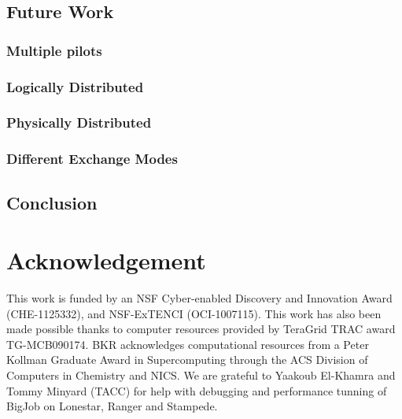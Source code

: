 \documentclass{sig-alternate}
\begin{document}
\subsection{Future Work}

\subsubsection{Multiple pilots}

\subsubsection{Logically Distributed}
\subsubsection{Physically Distributed}

\subsubsection{Different Exchange Modes}


\subsection{Conclusion}

\section*{Acknowledgement} {\footnotesize This work is funded by an
  NSF Cyber-enabled Discovery and Innovation Award (CHE-1125332), and
  NSF-ExTENCI (OCI-1007115). This work has also been made possible
  thanks to computer resources provided by TeraGrid TRAC award
  TG-MCB090174.  BKR acknowledges computational resources from a 
  Peter Kollman Graduate Award in Supercomputing through the ACS Division of 
  Computers in Chemistry and NICS. We are grateful to Yaakoub
  El-Khamra and Tommy Minyard (TACC) for help with debugging and
  performance tunning of BigJob on Lonestar, Ranger and Stampede.}


%
%

\end{document}
